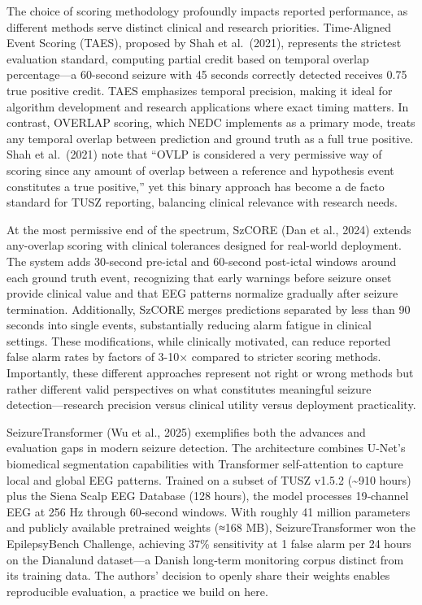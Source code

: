 \documentclass[
  10pt,
]{article}
\begin{document}
The choice of scoring methodology profoundly impacts reported
performance, as different methods serve distinct clinical and research
priorities. Time-Aligned Event Scoring (TAES), proposed by Shah et
al.~(2021), represents the strictest evaluation standard, computing
partial credit based on temporal overlap percentage---a 60-second
seizure with 45 seconds correctly detected receives 0.75 true positive
credit. TAES emphasizes temporal precision, making it ideal for
algorithm development and research applications where exact timing
matters. In contrast, OVERLAP scoring, which NEDC implements as a
primary mode, treats any temporal overlap between prediction and ground
truth as a full true positive. Shah et al.~(2021) note that ``OVLP is
considered a very permissive way of scoring since any amount of overlap
between a reference and hypothesis event constitutes a true positive,''
yet this binary approach has become a de facto standard for TUSZ
reporting, balancing clinical relevance with research needs.

At the most permissive end of the spectrum, SzCORE (Dan et al., 2024)
extends any-overlap scoring with clinical tolerances designed for
real-world deployment. The system adds 30-second pre-ictal and 60-second
post-ictal windows around each ground truth event, recognizing that
early warnings before seizure onset provide clinical value and that EEG
patterns normalize gradually after seizure termination. Additionally,
SzCORE merges predictions separated by less than 90 seconds into single
events, substantially reducing alarm fatigue in clinical settings. These
modifications, while clinically motivated, can reduce reported false
alarm rates by factors of 3-10× compared to stricter scoring methods.
Importantly, these different approaches represent not right or wrong
methods but rather different valid perspectives on what constitutes
meaningful seizure detection---research precision versus clinical
utility versus deployment practicality.

SeizureTransformer (Wu et al., 2025) exemplifies both the advances and
evaluation gaps in modern seizure detection. The architecture combines
U-Net's biomedical segmentation capabilities with Transformer
self-attention to capture local and global EEG patterns. Trained on a
subset of TUSZ v1.5.2 (\textasciitilde910 hours) plus the Siena Scalp
EEG Database (128 hours), the model processes 19‑channel EEG at 256 Hz
through 60‑second windows. With roughly 41 million parameters and
publicly available pretrained weights (≈168 MB), SeizureTransformer won
the EpilepsyBench Challenge, achieving 37\% sensitivity at 1 false alarm
per 24 hours on the Dianalund dataset---a Danish long‑term monitoring
corpus distinct from its training data. The authors' decision to openly
share their weights enables reproducible evaluation, a practice we build
on here.
\end{document}
